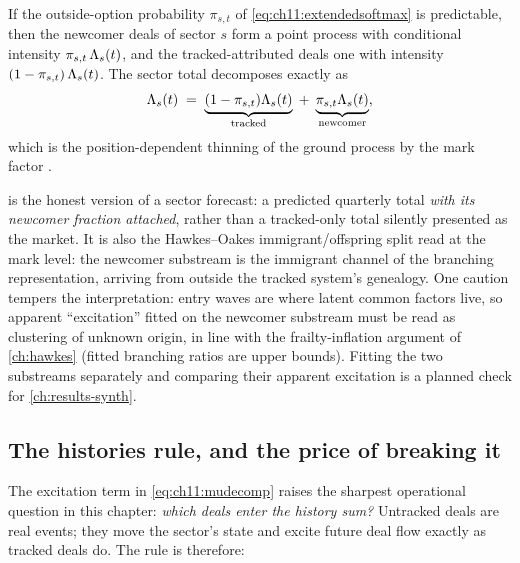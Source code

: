 \begin{corollary}\label{cor:ch11:split}
If the outside-option probability $\pi_{s,t}$ of
\cref{eq:ch11:extendedsoftmax} is predictable, then the newcomer deals of
sector $s$ form a point process with conditional intensity
$\pi_{s,t}\,\Lambda_s(t)$, and the tracked-attributed deals one with
intensity $(1-\pi_{s,t})\,\Lambda_s(t)$. The sector total decomposes
exactly as
\begin{equation}\label{eq:ch11:newintensity}
\Lambda_s(t) \;=\; \underbrace{(1-\pi_{s,t})\Lambda_s(t)}_{\text{tracked}}
\;+\; \underbrace{\pi_{s,t}\Lambda_s(t)}_{\text{newcomer}},
\end{equation}
which is the position-dependent thinning of the ground process by the
mark factor \citep[Ch.~5]{daley2003}.
\end{corollary}

 is the honest version of a sector forecast:
a predicted quarterly total \emph{with its newcomer fraction attached},
rather than a tracked-only total silently presented as the market. It is
also the Hawkes--Oakes immigrant/offspring split
\citep{hawkesoakes1974} read at the mark level: the newcomer substream is
the immigrant channel of the branching representation, arriving from
outside the tracked system's genealogy. One caution tempers the
interpretation: entry waves are where latent common factors live, so
apparent ``excitation'' fitted on the newcomer substream must be read
as clustering of unknown origin, in line with the frailty-inflation
argument of \cref{ch:hawkes} (fitted branching ratios are upper
bounds). Fitting the two substreams separately and comparing their
apparent excitation is a planned check for \cref{ch:results-synth}.

\subsection{The histories rule, and the price of breaking it}\label{ch11:sec:histories}

The excitation term in \cref{eq:ch11:mudecomp} raises the sharpest
operational question in this chapter: \emph{which deals enter
the history sum?} Untracked deals are real events; they move the sector's
state and excite future deal flow exactly as tracked deals do. The rule
is therefore:

